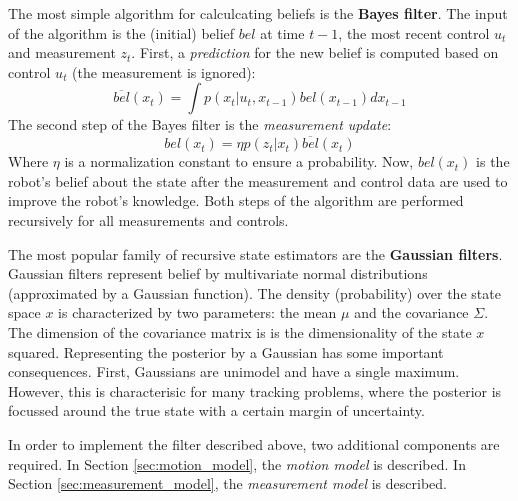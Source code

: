 {The most simple algorithm for calculcating beliefs is the \textbf{Bayes filter}.
The input of the algorithm is the (initial) belief $bel$ at time $t-1$, the most recent control $u_t$ and measurement $z_t$.
First, a \textit{prediction} for the new belief is computed based on control $u_t$ (the measurement is ignored):
\begin{equation}
\overline{bel}(x_t) = \int p(x_t | u_t, x_{t-1}) bel(x_{t-1}) dx_{t-1}
\end{equation}
The second step of the Bayes filter is the \textit{measurement update}:
\begin{equation}
bel(x_t) = \eta p(z_t | x_t) \overline{bel}(x_t)
\end{equation}
Where $\eta$ is a normalization constant to ensure a probability.
Now, $bel(x_t)$ is the robot's belief about the state after the measurement and control data are used to improve the robot's knowledge.
Both steps of the algorithm are performed recursively for all measurements and controls.

The most popular family of recursive state estimators are the \textbf{Gaussian filters}.
Gaussian filters represent belief by multivariate normal distributions (approximated by a Gaussian function).
The density (probability) over the state space $x$ is characterized by two parameters: the mean $\mu$ and the covariance $\Sigma$.
The dimension of the covariance matrix is is the dimensionality of the state $x$ squared.
Representing the posterior by a Gaussian has some important consequences.
First, Gaussians are unimodel and have a single maximum.
However, this is characterisic for many tracking problems, where the posterior is focussed around the true state with a certain margin of uncertainty.

In order to implement the filter described above, two additional components are required.
In Section \ref{sec:motion_model}, the \textit{motion model} is described.
In Section \ref{sec:measurement_model}, the \textit{measurement model} is described.

}
